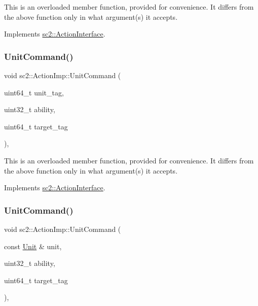 This is an overloaded member function, provided for convenience. It differs from the above function only in what argument(s) it accepts. 

Implements \hyperlink{classsc2_1_1_action_interface_adf9fa75730cc180e02e33bb3e09dc15e}{sc2\+::\+Action\+Interface}.

\mbox{\label{classsc2_1_1_action_imp_aba8628a8421f0e879efdb0c19018f7d6}} 
\subsubsection{\texorpdfstring{Unit\+Command()}{UnitCommand()}\hspace{0.1cm}{\footnotesize\ttfamily [5/6]}}
{\footnotesize\ttfamily void sc2\+::\+Action\+Imp\+::\+Unit\+Command (\begin{DoxyParamCaption}\item[{uint64\+\_\+t}]{unit\+\_\+tag,  }\item[{uint32\+\_\+t}]{ability,  }\item[{uint64\+\_\+t}]{target\+\_\+tag }\end{DoxyParamCaption})\hspace{0.3cm}{\ttfamily [override]}, {\ttfamily [virtual]}}

This is an overloaded member function, provided for convenience. It differs from the above function only in what argument(s) it accepts. 

Implements \hyperlink{classsc2_1_1_action_interface_a93d2b02440e21de680f5594817040696}{sc2\+::\+Action\+Interface}.

\mbox{\label{classsc2_1_1_action_imp_adeb0b8dc66628da18902cbc39a292a4d}} 
\subsubsection{\texorpdfstring{Unit\+Command()}{UnitCommand()}\hspace{0.1cm}{\footnotesize\ttfamily [6/6]}}
{\footnotesize\ttfamily void sc2\+::\+Action\+Imp\+::\+Unit\+Command (\begin{DoxyParamCaption}\item[{const \hyperlink{classsc2_1_1_unit}{Unit} \&}]{unit,  }\item[{uint32\+\_\+t}]{ability,  }\item[{uint64\+\_\+t}]{target\+\_\+tag }\end{DoxyParamCaption})\hspace{0.3cm}{\ttfamily [override]}, {\ttfamily [virtual]}}

